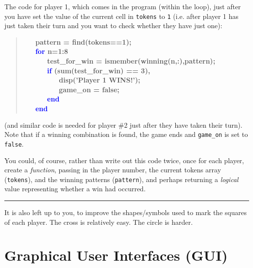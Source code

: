 \documentclass{tufte-book} %
\newenvironment{docspecbold}{\begin{quotation}\ttfamily\bfseries\parskip0pt\parindent0pt\ignorespaces}{\end{quotation}}
\begin{document}
\vspace{16mm}
\pagebreak

The code for player 1, which comes in the program (within the loop), just after you have set the value of the current cell in \texttt{tokens} to \texttt{1} (i.e. after player 1 has just taken their turn and you want to check whether they have just one):

\begin{docspecbold}
\ \ \             pattern = find(tokens==1);\\
\ \ \             \textcolor{blue}{for} n=1:8\\
\ \ \ \ \ \                 test\_for\_win = ismember(winning(n,:),pattern);\\
\ \ \ \ \ \                 \textcolor{blue}{if} (sum(test\_for\_win) == 3),\\
\ \ \ \ \ \ \ \ \                     disp(\textcolor[rgb]{1,0,1}{'Player 1 WINS!'});\\
\ \ \ \ \ \ \ \ \                     game\_on = false;\\
\ \ \ \ \ \                 \textcolor{blue}{end}\\
\ \ \             \textcolor{blue}{end}
\end{docspecbold}
(and similar code is needed for player \#2 just after they have taken their turn). Note that if a winning combination is found, the game ends and \texttt{game\_on} is set to \texttt{false}.

You could, of course, rather than write out this code twice, once for each player, create a \textit{function}, passing in the player number, the current tokens array (\texttt{tokens}), and the winning patterns (\texttt{pattern}), and perhaps returning a \textit{logical} value representing whether a win had occurred.

\vspace{1mm}
\noindent\rule{4cm}{0.5pt}
\vspace{2mm}

\noindent It is also left up to you, to improve the shapes/symbols used to mark the squares of each player. The cross is relatively easy. The circle is harder.


\chapter{Graphical User Interfaces (GUI)}
\label{ch:09}
\end{document}
